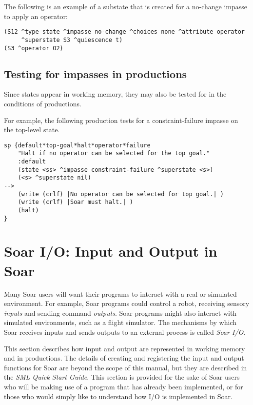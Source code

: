 The following is an example of a substate that is created for a no-change
impasse to apply an operator:
\begin{verbatim}
(S12 ^type state ^impasse no-change ^choices none ^attribute operator 
     ^superstate S3 ^quiescence t)
(S3 ^operator O2)
\end{verbatim} \vspace{12pt}

\subsection{Testing for impasses in productions}

Since states appear in working memory, they may also be
tested for in the conditions of productions.


For example, the following production tests for a constraint-failure impasse
on the top-level state.

\begin{verbatim}
sp {default*top-goal*halt*operator*failure
    "Halt if no operator can be selected for the top goal."
    :default
    (state <ss> ^impasse constraint-failure ^superstate <s>)
    (<s> ^superstate nil)
-->
    (write (crlf) |No operator can be selected for top goal.| )
    (write (crlf) |Soar must halt.| )
    (halt)
}
\end{verbatim}

\section{Soar I/O: Input and Output in Soar}
\label{SYNTAX-io}

Many Soar users will want their programs to interact with a real or simulated
environment. For example, Soar programs could control a robot, receiving sensory
\emph{inputs} and sending command \textit{outputs}. Soar programs might 
also interact with
simulated environments, such as a flight simulator. The mechanisms by which
Soar receives inputs and sends outputs to an external process is called
\emph{Soar I/O}.

This section describes how input and output are represented in working memory
and in productions.  The details of creating and registering the input and 
output functions for Soar are beyond the scope of this manual, but they are
described in the \textit{SML Quick Start Guide}.
This section is provided for the sake of Soar users who will be making
use of a program that has already been implemented, or for those who would
simply like to understand how I/O is implemented in Soar.


